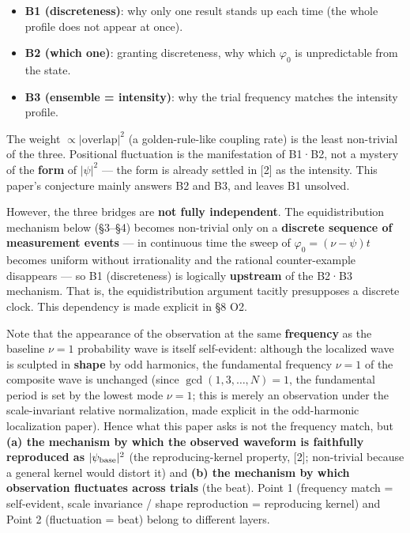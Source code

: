 \documentclass[
]{ltjsarticle}
\providecommand{\tightlist}{%
  \setlength{\itemsep}{0pt}\setlength{\parskip}{0pt}}
\begin{document}
\begin{itemize}
\tightlist
\item
  \textbf{B1 (discreteness)}: why only one result stands up each time
  (the whole profile does not appear at once).
\item
  \textbf{B2 (which one)}: granting discreteness, why which
  \(\varphi_0\) is unpredictable from the state.
\item
  \textbf{B3 (ensemble = intensity)}: why the trial frequency matches
  the intensity profile.
\end{itemize}

The weight \(\propto|\text{overlap}|^2\) (a golden-rule-like coupling
rate) is the least non-trivial of the three. Positional fluctuation is
the manifestation of B1·B2, not a mystery of the \textbf{form} of
\(|\psi|^2\) --- the form is already settled in {[}2{]} as the
intensity. This paper's conjecture mainly answers B2 and B3, and leaves
B1 unsolved.

However, the three bridges are \textbf{not fully independent}. The
equidistribution mechanism below (§3--§4) becomes non-trivial only on a
\textbf{discrete sequence of measurement events} --- in continuous time
the sweep of \(\varphi_0=(\nu-\psi)t\) becomes uniform without
irrationality and the rational counter-example disappears --- so B1
(discreteness) is logically \textbf{upstream} of the B2·B3 mechanism.
That is, the equidistribution argument tacitly presupposes a discrete
clock. This dependency is made explicit in §8 O2.

Note that the appearance of the observation at the same
\textbf{frequency} as the baseline \(\nu=1\) probability wave is itself
self-evident: although the localized wave is sculpted in \textbf{shape}
by odd harmonics, the fundamental frequency \(\nu=1\) of the composite
wave is unchanged (since \(\gcd(1,3,\dots,N)=1\), the fundamental period
is set by the lowest mode \(\nu=1\); this is merely an observation under
the scale-invariant relative normalization, made explicit in the
odd-harmonic localization paper). Hence what this paper asks is not the
frequency match, but \textbf{(a) the mechanism by which the observed
waveform is faithfully reproduced as \(|\psi_{\rm base}|^2\)} (the
reproducing-kernel property, {[}2{]}; non-trivial because a general
kernel would distort it) and \textbf{(b) the mechanism by which
observation fluctuates across trials} (the beat). Point 1 (frequency
match = self-evident, scale invariance / shape reproduction =
reproducing kernel) and Point 2 (fluctuation = beat) belong to different
layers.
\end{document}
